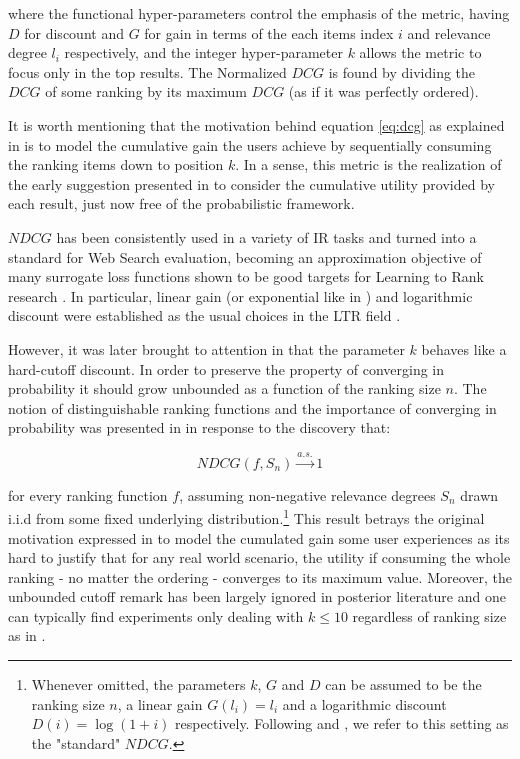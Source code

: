 \documentclass[a4paper, 10pt, conference]{ieeeconf}
\begin{document}
where the functional hyper-parameters  control the emphasis of the metric,
having $D$ for discount and $G$ for gain in terms of the each items index $i$
and relevance degree $l_i$ respectively, and the integer hyper-parameter $k$
allows the metric to focus only in the top results. The Normalized $DCG$ is
found by dividing the $DCG$ of some ranking by its maximum $DCG$ (as if it was
perfectly ordered).

It is worth mentioning that the motivation behind equation \ref{eq:dcg} as
explained in \cite{Jarvelin2002} is to model the cumulative gain the users
achieve by sequentially consuming the ranking items down to position $k$. In a
sense, this metric is the realization of the early suggestion presented in
\cite{Stephen1978} to consider the cumulative utility provided by each result,
just now free of the probabilistic framework.

$NDCG$ has been consistently used in a variety of IR tasks and turned into a
standard for Web Search evaluation, becoming an approximation objective of many
surrogate loss functions shown to be good targets for Learning to Rank research
\cite{Ravikumar2011}. In particular, linear  gain (or exponential like in
\cite{Burges2005}) and logarithmic discount were established as the usual
choices in the LTR field \cite{Liu2011}.

However, it was later brought to attention in \cite{Wang2013} that the parameter
$k$ behaves like a hard-cutoff discount. In order to preserve the property of
converging in probability it should grow unbounded as a function of the ranking
size $n$. The notion of distinguishable ranking functions and the importance of
converging in probability was presented in \cite{Wang2013} in response to the
discovery that:

\begin{equation}
\label{eq:ndcg_convergence}
NDCG(f, S_n) \xrightarrow{a.s.} 1
\end{equation}

for every ranking function $f$, assuming non-negative relevance degrees $S_n$
drawn i.i.d from some fixed underlying distribution.\footnote{Whenever omitted,
the parameters $k$, $G$ and $D$ can be assumed to be the ranking size $n$, a
linear gain $G(l_i)=l_i$ and a logarithmic discount $D(i)=\log(1+i)$
respectively. Following  \cite{Wang2013} and \cite{Liu2011}, we refer to this
setting as the "standard" $NDCG$.} This result betrays the original motivation
expressed in \cite{Jarvelin2002} to model the cumulated gain some user
experiences as its hard to justify that for any real world scenario, the utility
if consuming the whole ranking - no matter the ordering - converges to its
maximum value. Moreover, the unbounded cutoff remark has been largely ignored in
posterior literature and one can typically find experiments only dealing with $k
\leq 10$ regardless of ranking size as in \cite{Wang2017}.
\end{document}
